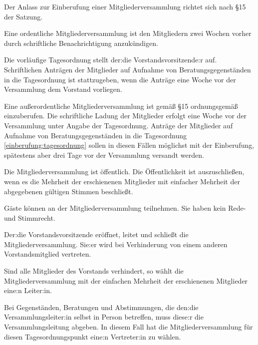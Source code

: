 \begin{gfmitglieder}


  \newcommand{\mitgliederversammlung}{\S 15}

  Der Anlass zur Einberufung einer Mitgliederversammlung richtet sich nach \mitgliederversammlung{} der Satzung.

  Eine ordentliche Mitgliederversammlung ist den Mitgliedern zwei Wochen vorher durch schriftliche Benachrichtigung anzukündigen.

  Die vorläufige Tagesordnung stellt der:die Vorstandsvorsitzende:r auf. Schriftlichen Anträgen der Mitglieder auf Aufnahme von Beratungsgegenständen in die Tagesordnung ist stattzugeben, wenn die Anträge eine Woche vor der Versammlung dem Vorstand vorliegen.
  \label{einberufung:tagesordnung}

  Eine außerordentliche Mitgliederversammlung ist gemäß \mitgliederversammlung{} ordnungsgemäß einzuberufen. Die schriftliche Ladung der Mitglieder erfolgt eine Woche vor der Versammlung unter Angabe der Tagesordnung. Anträge der Mitglieder auf Aufnahme von Beratungsgegenständen in die Tagesordnung \ref{einberufung:tagesordnung} sollen in diesen Fällen möglichst mit der Einberufung, spätestens aber drei Tage vor der Versammlung versandt werden.


  Die Mitgliederversammlung ist öffentlich. Die Öffentlichkeit ist auszuschließen, wenn es die Mehrheit der erschienenen Mitglieder mit einfacher Mehrheit der abgegebenen gültigen Stimmen beschließt.

  Gäste können an der Mitgliederversammlung teilnehmen. Sie haben kein Rede- und Stimmrecht.


  Der:die Vorstandsvorsitzende eröffnet, leitet und schließt die Mitgliederversammlung. Sie:er wird bei Verhinderung von einem anderen Vorstandsmitglied vertreten.

  Sind alle Mitglieder des Vorstands verhindert, so wählt die Mitgliederversammlung mit der einfachen Mehrheit der erschienenen Mitglieder eine:n Leiter:in.

  Bei Gegenständen, Beratungen und Abstimmungen, die den:die Versammlungsleiter:in selbst in Person betreffen, muss diese:r die Versammlungsleitung abgeben. In diesem Fall hat die Mitgliederversammlung für diesen Tagesordnungspunkt eine:n Vertreter:in zu wählen.


\end{gfmitglieder}
